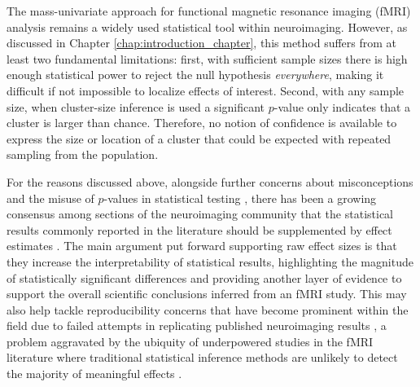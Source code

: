 The mass-univariate approach for functional magnetic resonance imaging (fMRI) analysis remains a widely used  statistical tool within neuroimaging. However, as discussed in Chapter \ref{chap:introduction_chapter}, this method suffers from at least two fundamental limitations: first, with sufficient sample sizes there is high enough statistical power to reject the null hypothesis \textit{everywhere}, making it difficult if not impossible to localize effects of interest. Second, with any sample size, when cluster-size inference is used a significant $p$-value only indicates that a cluster is larger than chance. Therefore, no notion of confidence is available to express the size or location of a cluster that could be expected with repeated sampling from the population.

For the reasons discussed above, alongside further concerns about misconceptions and the misuse of $p$-values in statistical testing \citep{Nuzzo2014-wi,Wasserstein2016-hv}, there has been a growing consensus among sections of the neuroimaging community that the statistical results commonly reported in the literature should be supplemented by effect estimates \citep{Chen2017-sb,Nichols2017-zo}. The main argument put forward supporting raw effect sizes is that they increase the interpretability of statistical results, highlighting the magnitude of statistically significant differences and providing another layer of evidence to support the overall scientific conclusions inferred from an fMRI study. This may also help tackle reproducibility concerns that have become prominent within the field due to failed attempts in replicating published neuroimaging results \citep{Poldrack2017-rr}, a problem aggravated by the ubiquity of underpowered studies in the fMRI literature where traditional statistical inference methods are unlikely to detect the majority of meaningful effects \citep{Cremers2017-qk,Turner2018-xs}.  

